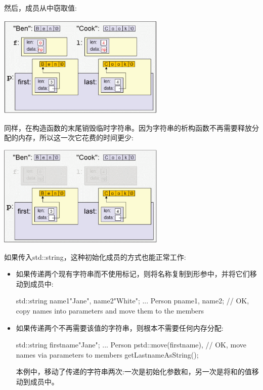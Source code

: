 然后，成员从中窃取值:

\begin{center}
	\includegraphics[width=0.6\textwidth]{part1/ch4/images/6}
\end{center}

同样，在构造函数的末尾销毁临时字符串。因为字符串的析构函数不再需要释放分配的内存，所以这一次它花费的时间更少:

\begin{center}
	\includegraphics[width=0.6\textwidth]{part1/ch4/images/7}
\end{center}

如果传入std::string，这种初始化成员的方式也能正常工作:

\begin{itemize}
	\item 如果传递两个现有字符串而不使用标记，则将名称复制到形参中，并将它们移动到成员中:

	\begin{cppcode}
std::string name1{"Jane"}, name2{"White"};
...
Person p{name1, name2}; // OK, copy names into parameters and move them to the members
	\end{cppcode}
	\item 如果传递两个不再需要该值的字符串，则根本不需要任何内存分配:
	\begin{cppcode}
std::string firstname{"Jane"};
...
Person p{std::move(firstname), // OK, move names via parameters to members
	getLastnameAsString()};
	\end{cppcode}
	本例中，移动了传递的字符串两次:一次是初始化参数和，另一次是将和的值移动到成员中。
\end{itemize}

